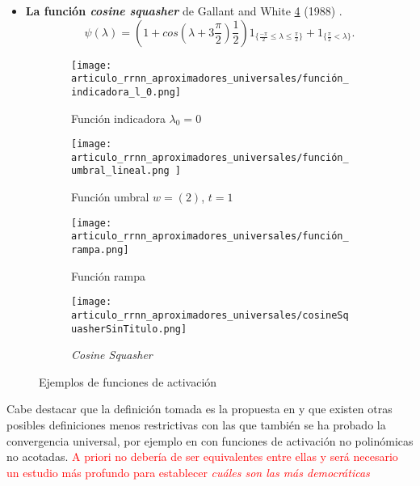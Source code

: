 \begin{definicion}
\begin{itemize}
        \item \textbf{La función \textit{cosine squasher}} de Gallant and White 
        \ref{fig:cosine_squasher} (1988) \cite{Gallant88thereexists}. 
        \begin{equation*}
    \psi(\lambda )= \left(1 + cos\left(\lambda + 3 \frac{\pi}{2} \right) \frac{1}{2}\right) 
     1_{\{\frac{-\pi}{2} \leq \lambda \leq  \frac{\pi}{2}\}}
     +
     1_{\{ \frac{\pi}{2} < \lambda \}}.
    \end{equation*}
    \end{itemize}
    \begin{figure}[h]
        \centering
        \begin{subfigure}[t]{0.47\textwidth}
            \centering
            \texttt{[image: 
                articulo\_rrnn\_aproximadores\_universales/función\_indicadora\_l\_0.png]}
            \caption{Función indicadora $\lambda_0 = 0$}  
            \label{fig:función_indicadora}
        \end{subfigure}
        \hfill
        \begin{subfigure}[t]{0.47\textwidth}  
            \centering 
            \texttt{[image: articulo\_rrnn\_aproximadores\_universales/función\_umbral\_lineal.png
            ]}
            \caption{Función umbral $w=(2)$, $t=1$}    
            \label{fig:función_umbral_lineal}
        \end{subfigure}
        \begin{subfigure}[t]{0.47\textwidth}   
            \centering 
            \texttt{[image: articulo\_rrnn\_aproximadores\_universales/función\_rampa.png]}
            \caption{Función rampa} 
            \label{fig:funciones_rampa}
        \end{subfigure}
        \hfill
        \begin{subfigure}[t]{0.47\textwidth}   
            \centering 
            \texttt{[image: articulo\_rrnn\_aproximadores\_universales/cosineSquasherSinTitulo.png]}
            \caption{\textit{Cosine Squasher}}   
            \label{fig:cosine_squasher}
        \end{subfigure}
        \caption{Ejemplos de funciones de activación} 
        \label{fig:EjemplosFunciónActivación}
    \end{figure}

    Cabe destacar que la definición tomada es la propuesta en \cite{HORNIK1989359} y que existen
    otras posibles definiciones menos restrictivas con las que también se ha probado la convergencia universal,
    por ejemplo en \cite{DBLP:journals/corr/SonodaM15} con funciones de activación no polinómicas no acotadas. 
    \textcolor{red}{A priori no debería de ser equivalentes entre ellas y será necesario un estudio más 
    profundo para establecer \textit{cuáles son las más democráticas}}
\end{definicion}



